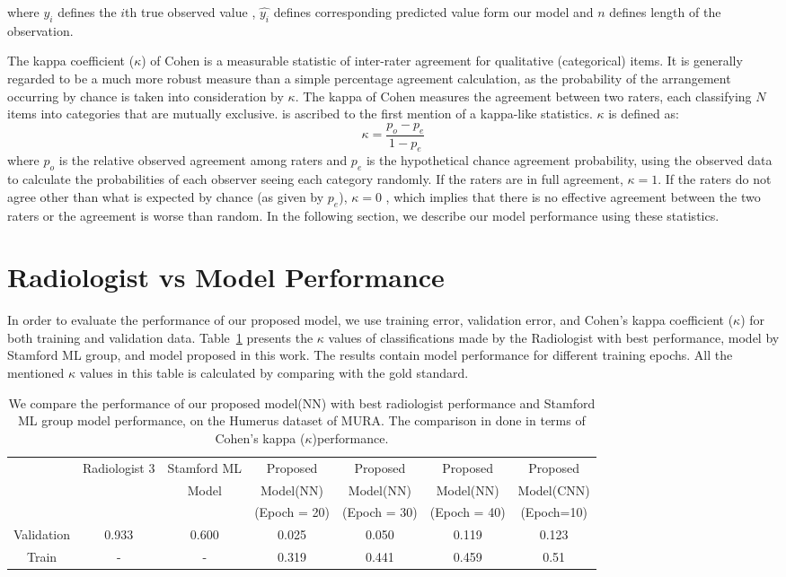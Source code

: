 \documentclass{article}
\begin{document}
where $y_i$ defines the $i$th true observed value , $\hat{y_i}$ defines corresponding predicted value form our model and $n$ defines length of the observation. 

The kappa coefficient ($\kappa$) of Cohen is a measurable statistic of inter-rater agreement for qualitative (categorical) items. It is generally regarded to be a much more robust measure than a simple percentage agreement calculation, as the probability of the arrangement occurring by chance is taken into consideration by $\kappa$. The kappa of Cohen measures the agreement between two raters, each classifying $N$ items into categories that are mutually exclusive. \cite{galton} is ascribed to the first mention of a kappa-like statistics. ${\kappa }$ is defined as:
\begin{equation}
\kappa=\frac{p_o-p_e}{1-p_e}    
\end{equation}
where $p_o$ is the relative observed agreement among raters and $p_e$ is the hypothetical chance agreement probability, using the observed data to calculate the probabilities of each observer seeing each category randomly.  If the raters are in full agreement, $\kappa=1$. If the raters do not agree other than what is expected by chance (as given by $p_e$), $\kappa=0$ , which implies that there is no effective agreement between the two raters or the agreement is worse than random. In the following section, we describe our model performance using these statistics. 

\section{Radiologist vs Model Performance}
In order to evaluate the performance of our proposed model, we use training error, validation error, and Cohen's kappa coefficient ($\kappa$) for both training and validation data. Table~\ref{results} presents the $\kappa$ values of classifications made by the Radiologist with best performance, model by Stamford ML group, and model proposed in this work. The results contain model performance for different training epochs. All the mentioned $\kappa$ values in this table is calculated by comparing with the gold standard. 
\begin{table}[h]
    \centering
    \begin{tabular}{|c|c|c|c|c|c|c|}
    \hline
    &Radiologist 3 & Stamford ML & Proposed & Proposed & Proposed & Proposed  \\
    &&Model&Model(NN)&Model(NN)&Model(NN)&Model(CNN)\\
    &&&(Epoch = 20)&(Epoch = 30)&(Epoch = 40)&(Epoch=10)\\
    \hline
    Validation&0.933&0.600&0.025&0.050&0.119&0.123\\
    \hline
    Train&-&-&0.319&0.441&0.459&0.51\\
    \hline
    \end{tabular}
    \caption{We compare the performance of our proposed model(NN) with best radiologist performance and Stamford ML group model performance, on the Humerus dataset of MURA. The comparison in done in terms of Cohen's kappa ($\kappa$)performance.}
    \label{results}
\end{table}
\end{document}
